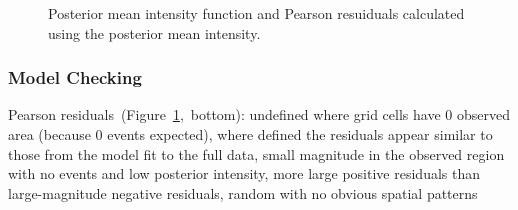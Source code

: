 \documentclass[]{interact}
\begin{document}
\begin{figure}[h]


\caption{Posterior mean intensity function and Pearson resuiduals calculated
using the posterior mean intensity.}
\label{effortintensity}
\end{figure}


\subsubsection{Model Checking}

Pearson residuals~(Figure~\ref{effortintensity},~bottom): undefined where grid cells
have 0 observed area (because 0 events expected), where defined the residuals
appear similar to those from the model fit to the full data, small magnitude
in the observed region with no events and low posterior intensity, more large
positive residuals than large-magnitude negative residuals, random with no
obvious spatial patterns
\end{document}
